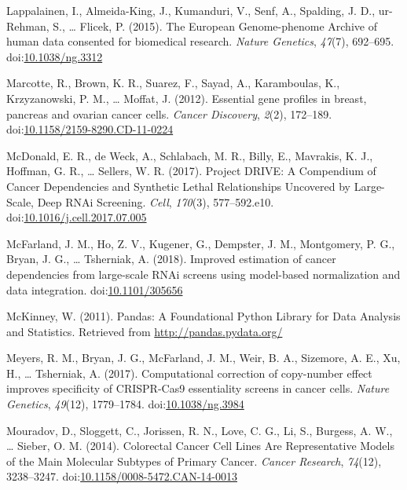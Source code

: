 \documentclass[man]{apa6}
\begin{document}
\hypertarget{ref-lappalainen2015}{}
Lappalainen, I., Almeida-King, J., Kumanduri, V., Senf, A., Spalding, J.
D., ur-Rehman, S., \ldots{} Flicek, P. (2015). The European
Genome-phenome Archive of human data consented for biomedical research.
\emph{Nature Genetics}, \emph{47}(7), 692--695.
doi:\href{https://doi.org/10.1038/ng.3312}{10.1038/ng.3312}

\hypertarget{ref-marcotte2012}{}
Marcotte, R., Brown, K. R., Suarez, F., Sayad, A., Karamboulas, K.,
Krzyzanowski, P. M., \ldots{} Moffat, J. (2012). Essential gene profiles
in breast, pancreas and ovarian cancer cells. \emph{Cancer Discovery},
\emph{2}(2), 172--189.
doi:\href{https://doi.org/10.1158/2159-8290.CD-11-0224}{10.1158/2159-8290.CD-11-0224}

\hypertarget{ref-mcdonald2017}{}
McDonald, E. R., de Weck, A., Schlabach, M. R., Billy, E., Mavrakis, K.
J., Hoffman, G. R., \ldots{} Sellers, W. R. (2017). Project DRIVE: A
Compendium of Cancer Dependencies and Synthetic Lethal Relationships
Uncovered by Large-Scale, Deep RNAi Screening. \emph{Cell},
\emph{170}(3), 577--592.e10.
doi:\href{https://doi.org/10.1016/j.cell.2017.07.005}{10.1016/j.cell.2017.07.005}

\hypertarget{ref-mcfarland2018}{}
McFarland, J. M., Ho, Z. V., Kugener, G., Dempster, J. M., Montgomery,
P. G., Bryan, J. G., \ldots{} Tsherniak, A. (2018). Improved estimation
of cancer dependencies from large-scale RNAi screens using model-based
normalization and data integration.
doi:\href{https://doi.org/10.1101/305656}{10.1101/305656}

\hypertarget{ref-mckinney2011}{}
McKinney, W. (2011). Pandas: A Foundational Python Library for Data
Analysis and Statistics. Retrieved from \url{http://pandas.pydata.org/}

\hypertarget{ref-meyers2017}{}
Meyers, R. M., Bryan, J. G., McFarland, J. M., Weir, B. A., Sizemore, A.
E., Xu, H., \ldots{} Tsherniak, A. (2017). Computational correction of
copy-number effect improves specificity of CRISPR-Cas9 essentiality
screens in cancer cells. \emph{Nature Genetics}, \emph{49}(12),
1779--1784. doi:\href{https://doi.org/10.1038/ng.3984}{10.1038/ng.3984}

\hypertarget{ref-mouradov2014}{}
Mouradov, D., Sloggett, C., Jorissen, R. N., Love, C. G., Li, S.,
Burgess, A. W., \ldots{} Sieber, O. M. (2014). Colorectal Cancer Cell
Lines Are Representative Models of the Main Molecular Subtypes of
Primary Cancer. \emph{Cancer Research}, \emph{74}(12), 3238--3247.
doi:\href{https://doi.org/10.1158/0008-5472.CAN-14-0013}{10.1158/0008-5472.CAN-14-0013}
\end{document}
